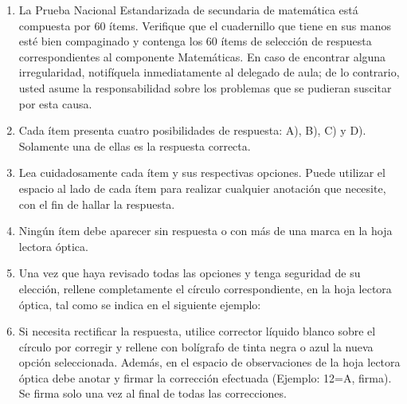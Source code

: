 \documentclass[12pt]{article}
\begin{document}
\begin{enumerate}[leftmargin=*, itemsep=3pt, topsep=2pt, parsep=0pt]
  \item La Prueba Nacional Estandarizada de secundaria de matem\'atica est\'a compuesta por 60 \'items. Verifique que el cuadernillo que tiene en sus manos est\'e bien compaginado y contenga los 60 \'items de selecci\'on de respuesta correspondientes al componente Matem\'aticas. En caso de encontrar alguna irregularidad, notif\'iquela inmediatamente al delegado de aula; de lo contrario, usted asume la responsabilidad sobre los problemas que se pudieran suscitar por esta causa.

  \item Cada \'item presenta cuatro posibilidades de respuesta: A), B), C) y D). Solamente una de ellas es la respuesta correcta.

  \item Lea cuidadosamente cada \'item y sus respectivas opciones. Puede utilizar el espacio al lado de cada \'item para realizar cualquier anotaci\'on que necesite, con el fin de hallar la respuesta.

  \item Ning\'un \'item debe aparecer sin respuesta o con m\'as de una marca en la hoja lectora \'optica.

  \item Una vez que haya revisado todas las opciones y tenga seguridad de su elecci\'on, rellene completamente el c\'irculo correspondiente, en la hoja lectora \'optica, tal como se indica en el siguiente ejemplo:

  \begin{center}
  \end{center}

  \item Si necesita rectificar la respuesta, utilice corrector l\'iquido blanco sobre el c\'irculo por corregir y rellene con bol\'igrafo de tinta negra o azul la nueva opci\'on seleccionada. Adem\'as, en el espacio de observaciones de la hoja lectora \'optica debe anotar y firmar la correcci\'on efectuada (Ejemplo: 12=A, firma). Se firma solo una vez al final de todas las correcciones.
\end{enumerate}
\end{document}
